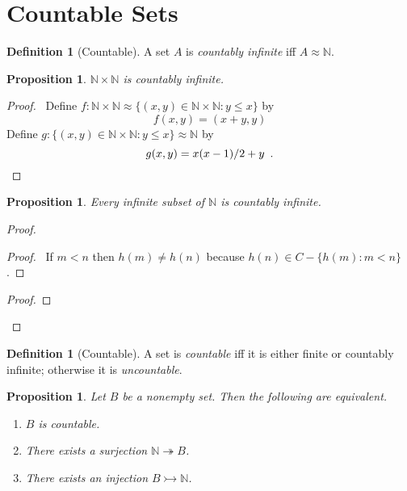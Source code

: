 \documentclass{book}
\let\qed\relax
\newtheorem{prop}[ax]{Proposition}
\theoremstyle{definition}
\newtheorem{df}[ax]{Definition}
\begin{document}
\section{Countable Sets}

\begin{df}[Countable]
A set $A$ is \emph{countably infinite} iff $A \approx \mathbb{N}$.
\end{df}

\begin{prop}
$\mathbb{N} \times \mathbb{N}$ is countably infinite.
\end{prop}

\begin{proof}
\pf\ Define $f : \mathbb{N} \times \mathbb{N} \approx \{ (x,y) \in \mathbb{N} \times \mathbb{N} : y \leq x \}$ by
\[ f(x,y) = (x+y,y) \]
Define $g : \{ (x,y) \in \mathbb{N} \times \mathbb{N} : y \leq x \} \approx \mathbb{N}$ by
\[ g(x,y) = x(x-1)/2 + y \enspace . \qed \]
\end{proof}

\begin{prop}
Every infinite subset of $\mathbb{N}$ is countably infinite.
\end{prop}

\begin{proof}
\pf
{}
\begin{proof}
	\pf\ If $m < n$ then $h(m) \neq h(n)$ because $h(n) \in C - \{ h(m) : m < n \}$.
\end{proof}
\begin{proof}
\end{proof}
\qed
\end{proof}

\begin{df}[Countable]
A set is \emph{countable} iff it is either finite or countably infinite; otherwise it is \emph{uncountable}.
\end{df}

\begin{prop}
Let $B$ be a nonempty set. Then the following are equivalent.
\begin{enumerate}
\item $B$ is countable.
\item There exists a surjection $\mathbb{N} \twoheadrightarrow B$.
\item There exists an injection $B \rightarrowtail \mathbb{N}$.
\end{enumerate}
\end{prop}
\end{document}
